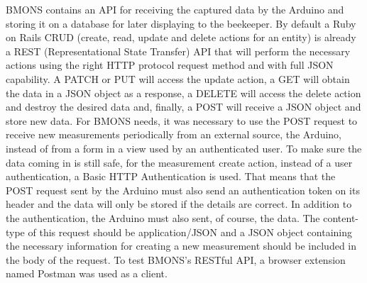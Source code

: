 BMONS contains an API for receiving the captured data by the Arduino and storing it on a database for later displaying to the beekeeper. By default a Ruby on Rails CRUD (create, read, update and delete actions for an entity) is already a REST (Representational State Transfer) API that will perform the necessary actions using the right HTTP protocol request method and with full JSON capability. A PATCH or PUT will access the update action, a GET will obtain the data in a JSON object as a response, a DELETE will access the delete action and destroy the desired data and, finally, a POST will receive a JSON object and store new data. For BMONS needs, it was necessary to use the POST request to receive new measurements periodically from an external source, the Arduino, instead of from a form in a view used by an authenticated user. To make sure the data coming in is still safe, for the measurement create action, instead of a user authentication, a Basic HTTP Authentication is used. That means that the POST request sent by the Arduino must also send an authentication token on its header and the data will only be stored if the details are correct. In addition to the authentication, the Arduino must also sent, of course, the data. The content-type of this request should be application/JSON and a JSON object containing the necessary information for creating a new measurement should be included in the body of the request. To test BMONS's RESTful API, a browser extension named Postman was used as a client. 
